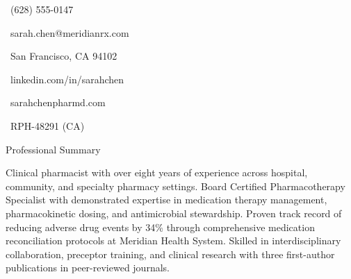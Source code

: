 \documentclass[11pt,letterpaper]{article}
\begin{document}
\thispagestyle{empty}


\vspace*{0.35in}

\begin{minipage}[t]{0.32\textwidth}
  \centering
  \faPhone\ \small (628) 555-0147
\end{minipage}
\begin{minipage}[t]{0.36\textwidth}
  \centering
  \faEnvelope\ \small sarah.chen@meridianrx.com
\end{minipage}
\begin{minipage}[t]{0.32\textwidth}
  \centering
  \faMapMarker*\ \small San Francisco, CA 94102
\end{minipage}

\vspace{4pt}

\begin{minipage}[t]{0.32\textwidth}
  \centering
  \faLinkedin\ \small linkedin.com/in/sarahchen
\end{minipage}
\begin{minipage}[t]{0.36\textwidth}
  \centering
  \faGlobe\ \small sarahchenpharmd.com
\end{minipage}
\begin{minipage}[t]{0.32\textwidth}
  \centering
  \faIdBadge\ \small RPH-48291 (CA)
\end{minipage}

\vspace{8pt}

\begin{sectionbox}
  Professional Summary
\end{sectionbox}

Clinical pharmacist with over eight years of experience across hospital, community, and specialty pharmacy settings. Board Certified Pharmacotherapy Specialist with demonstrated expertise in medication therapy management, pharmacokinetic dosing, and antimicrobial stewardship. Proven track record of reducing adverse drug events by 34\% through comprehensive medication reconciliation protocols at Meridian Health System. Skilled in interdisciplinary collaboration, preceptor training, and clinical research with three first-author publications in peer-reviewed journals.
\end{document}
